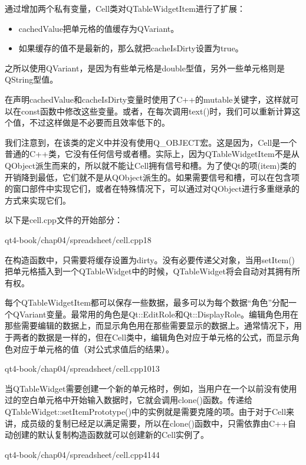 \documentclass[11pt,oneside]{book}
\begin{document}
\begin{common-format}
通过增加两个私有变量，Cell类对QTableWidgetItem进行了扩展：
\begin{itemize}
\item cachedValue把单元格的值缓存为QVariant。
\item 如果缓存的值不是最新的，那么就把cacheIsDirty设置为true。
\end{itemize}
之所以使用QVariant，是因为有些单元格是double型值，另外一些单元格则是QString型值。

在声明cachedValue和cacheIsDirty变量时使用了C++的mutable关键字，这样就可以在const函数中修改这些变量。或者，在每次调用text()时，我们可以重新计算这个值，不过这样做是不必要而且效率低下的。

我们注意到，在该类的定义中并没有使用Q\_{}OBJECT宏。这是因为，Cell是一个普通的C++类，它没有任何信号或者槽。实际上，因为QTableWidgetItem不是从QObject派生而来的，所以就不能让Cell拥有信号和槽。为了使Qt的项(item)类的开销降到最低，它们就不是从QObject派生的。如果需要信号和槽，可以在包含项的窗口部件中实现它们，或者在特殊情况下，可以通过对QObject进行多重继承的方式来实现它们。 

以下是cell.cpp文件的开始部分：
\begin{cppline}{qt4-book/chap04/spreadsheet/cell.cpp}{1}{8}
\end{cppline}

在构造函数中，只需要将缓存设置为dirty。没有必要传递父对象，当用setItem()把单元格插入到一个QTableWidget中的时候，QTableWidget将会自动对其拥有所有权。

每个QTableWidgetItem都可以保存一些数据，最多可以为每个数据“角色”分配一个QVariant变量。最常用的角色是Qt::EditRole和Qt::DisplayRole。编辑角色用在那些需要编辑的数据上，而显示角色用在那些需要显示的数据上。通常情况下，用于两者的数据是一样的，但在Cell类中，编辑角色对应于单元格的公式，而显示角色对应于单元格的值（对公式求值后的结果）。

\begin{cppline}{qt4-book/chap04/spreadsheet/cell.cpp}{10}{13}
\end{cppline}

当QTableWidget需要创建一个新的单元格时，例如，当用户在一个以前没有使用过的空白单元格中开始输入数据时，它就会调用clone()函数。传递给QTableWidget::setItemPrototype()中的实例就是需要克隆的项。由于对于Cell来讲，成员级的复制已经足以满足需要，所以在clone()函数中，只需依靠由C++自动创建的默认复制构造函数就可以创建新的Cell实例了。

\begin{cppline}{qt4-book/chap04/spreadsheet/cell.cpp}{41}{44}
\end{cppline}


\end{common-format}
\end{document}
